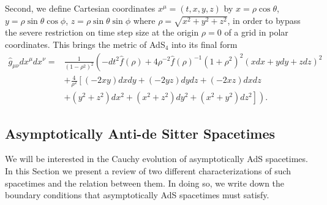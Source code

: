 \documentclass[a4paper,11pt]{article}
\begin{document}
Second, we define Cartesian coordinates $x^\mu=(t,x,y,z)$ by $x=\rho\cos\theta$, $y=\rho\sin\theta\cos\phi$, $z=\rho\sin\theta\sin\phi$ where $\rho=\sqrt{x^2+y^2+z^2}$, in order to bypass the severe restriction on time step size at the origin $\rho=0$ of a grid in polar coordinates. 
This brings the metric of AdS$_4$ into its final form
\begin{eqnarray}\label{eqn:ads4_final}
\hat{g}_{\mu\nu}dx^{\mu}dx^{\nu}=&\frac{1}{\left(1-\rho^2\right)^2 }\left( -dt^2 \hat{f}(\rho) +4\rho^{-2}\hat{f}(\rho)^{-1} \left(1+\rho^2\right)^2 (x dx + y dy + z dz)^2 \right. \nonumber \\
&+\frac{4}{\rho^2} \left[\left(-2 x y\right) dx dy + \left(- 2 y z\right) dy dz + \left(- 2 x z\right) dx dz \right. \nonumber \\
&\left. \left. + \left(y^2+z^2\right) dx^2 + \left(x^2+z^2\right) dy^2 + \left(x^2+y^2\right) dz^2 \right] \right).
\end{eqnarray}


\subsection{Asymptotically Anti-de Sitter Spacetimes}\label{subsec:asyAdS}

We will be interested in the Cauchy evolution of asymptotically AdS spacetimes. In this Section we present a review of two different characterizations of such spacetimes and the relation between them. In doing so, we write down the boundary conditions that asymptotically AdS spacetimes must satisfy.



\end{document}
